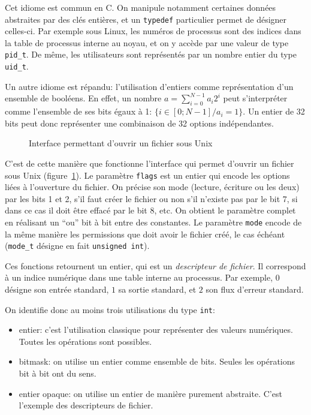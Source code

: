 Cet idiome est commun en C. On manipule notamment certaines données abstraites
par des clés entières, et un \texttt{typedef} particulier permet de désigner
celles-ci. Par exemple sous Linux, les numéros de processus sont des indices
dans la table de processus interne au noyau, et on y accède par une valeur de
type \texttt{pid\_t}. De même, les utilisateurs sont représentés par un nombre
entier du type \texttt{uid\_t}.

Un autre idiome est répandu: l'utilisation d'entiers comme représentation d'un
ensemble de booléens. En effet, un nombre $a = \sum_{i=0}^{N-1} a_i 2^i$ peut
s'interpréter comme l'ensemble de ses bits égaux à 1: $\{ i ∈ [0;N-1] / a_i = 1
\}$. Un entier de 32 bits peut donc représenter une combinaison de 32 options
indépendantes.

\begin{figure}
    \caption{Interface permettant d'ouvrir un fichier sous Unix}
    \label{fig:unix-open}
\end{figure}

C'est de cette manière que fonctionne l'interface qui permet d'ouvrir un fichier
sous Unix (figure~\ref{fig:unix-open}). Le paramètre \texttt{flags} est un
entier qui encode les options liées à l'ouverture du fichier. On précise son
mode (lecture, écriture ou les deux) par les bits 1 et 2, s'il faut créer le
fichier ou non s'il n'existe pas par le bit 7, si dans ce cas il doit être
effacé par le bit 8, etc. On obtient le paramètre complet en réalisant un
\enquote{ou} bit à bit entre des constantes. Le paramètre \texttt{mode} encode
de la même manière les permissions que doit avoir le fichier créé, le cas
échéant (\texttt{mode\_t} désigne en fait \texttt{unsigned int}).

Ces fonctions retournent un entier, qui est un \emph{descripteur de fichier}. Il
correspond à un indice numérique dans une table interne au processus. Par
exemple, $0$ désigne son entrée standard, $1$ sa sortie standard, et $2$ son
flux d'erreur standard.

On identifie donc au moins trois utilisations du type \texttt{int}:

\begin{itemize}
    \item entier: c'est l'utilisation classique pour représenter des valeurs
        numériques. Toutes les opérations sont possibles.
    \item bitmask: on utilise un entier comme ensemble de bits. Seules les
        opérations bit à bit ont du sens.
    \item entier opaque: on utilise un entier de manière purement abstraite.
        C'est l'exemple des descripteurs de fichier.
\end{itemize}


